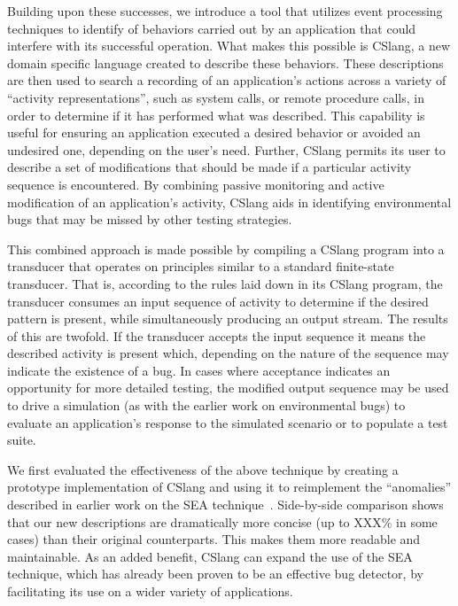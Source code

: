 Building upon these successes,
we introduce a tool
that utilizes event processing techniques
to identify
of behaviors carried out by an application
that could interfere with its successful operation.
What makes this possible is CSlang,
a new domain specific language
created to describe these behaviors.
These descriptions are then used
to search a recording of an application's actions
across a variety of ``activity representations'',
such as system calls,
or remote procedure calls,
in order to determine if it has
performed what was described.
This capability is useful
for ensuring an application executed a desired behavior
or avoided an undesired one,
depending on the user's need.
Further, CSlang permits
its user to describe a set of modifications
that should be made
if a particular activity sequence is encountered.
By combining passive monitoring and active modification
of an application's activity,
CSlang aids in identifying environmental bugs
that may be missed by other testing strategies.

This combined approach is made possible
by compiling a CSlang program
into a transducer
that operates on principles similar
to a standard finite-state transducer.
That is,
according to the rules laid down in its CSlang program,
the transducer consumes an input sequence of activity
to determine if the desired pattern is present,
while simultaneously producing an output stream.
The results of this are twofold.
If the transducer accepts the input sequence
it means the described activity is present which,
depending on the nature of the sequence
may indicate the existence of a bug.
In cases where acceptance indicates an opportunity
for more detailed testing,
the modified output sequence may be used
to drive a simulation (as with the earlier work on environmental bugs)
to evaluate an application's response to the simulated scenario
or to populate a test suite.

We first evaluated the effectiveness of the above technique
by creating a prototype implementation of CSlang
and using it to
reimplement the ``anomalies''
described in earlier work on the SEA technique~\cite{crashsim}.
Side-by-side comparison shows that our new
descriptions are dramatically more concise (up to XXX\% in some cases)
than their original counterparts.
This makes them
more readable
and maintainable.
As an added benefit,
CSlang can expand the use of the SEA technique,
which has already been proven
to be an effective bug detector,
by facilitating its use
on a wider variety of applications.

